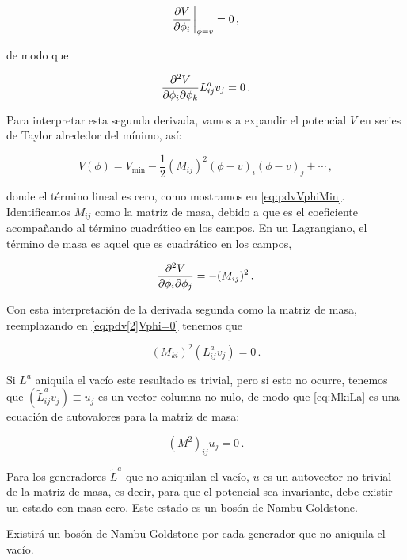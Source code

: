 \begin{equation}
    \label{eq:pdvVphiMin}
    \pdv{V}{\phi_i} \eval_{\phi = v} = 0 \,,
\end{equation}

\noindent de modo que

\begin{equation}
    \label{eq:pdv[2]Vphi=0}
    \pdv[2]{V}{\phi_i}{\phi_k} L^a_{ij} v_j = 0 \,.
\end{equation}

Para interpretar esta segunda derivada, vamos a expandir el potencial $V$ en series de Taylor alrededor del mínimo, así:

\begin{equation}
    V(\phi) = V_{\text{min}} - \frac{1}{2} (M_{ij})^2 (\phi - v)_i (\phi - v)_j + \cdots \,,
\end{equation}

\noindent donde el término lineal es cero, como mostramos en \eqref{eq:pdvVphiMin}. Identificamos $M_{ij}$ como la matriz de masa, debido a que es el coeficiente acompañando al término cuadrático en los campos. En un Lagrangiano, el término de masa es aquel que es cuadrático en los campos,

\begin{equation}
    \pdv[2]{V}{\phi_i}{\phi_j} = - (M_{ij})^2 \,.
\end{equation}

Con esta interpretación de la derivada segunda como la matriz de masa, reemplazando en \eqref{eq:pdv[2]Vphi=0} tenemos que

\begin{equation}
    \label{eq:MkiLa}
    (M_{ki})^2 (L^a_{ij}v_j) = 0 \,.
\end{equation}

Si $L^a$ aniquila el vacío este resultado es trivial, pero si esto no ocurre, tenemos que $(\tilde{L}^a_{ij}v_j) \equiv u_j$ es un vector columna no-nulo, de modo que \eqref{eq:MkiLa} es una ecuación de autovalores para la matriz de masa:

\begin{equation}
    (M^2)_{ij} u_j = 0 \,.
\end{equation}

Para los generadores $\tilde{L}^a$ que no aniquilan el vacío, $u$ es un autovector no-trivial de la matriz de masa, es decir, para que el potencial sea invariante, debe existir un estado con masa cero. Este estado es un bosón de Nambu-Goldstone.

\begin{cabox}
     Existirá un bosón de Nambu-Goldstone por cada generador que no aniquila el vacío.
\end{cabox}





